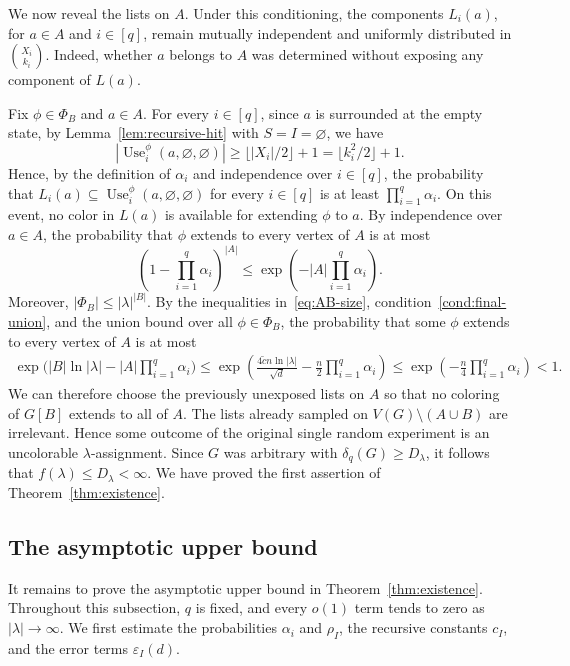 \documentclass[12pt]{article}
\numberwithin{equation}{section}
\theoremstyle{definition}
\newcommand{\Use}{\operatorname{Use}}
\begin{document}
We now reveal the lists on $A$. Under this conditioning,
the components $L_i(a)$, for $a\in A$ and $i\in[q]$, remain mutually
independent and uniformly distributed in $\binom{X_i}{k_i}$. Indeed, whether
$a$ belongs to $A$ was determined without exposing any component of $L(a)$.

Fix $\phi \in \Phi_B$ and $a \in A$. For every $i \in [q]$, since $a$ is
surrounded at the empty state, by Lemma~\ref{lem:recursive-hit} with
$S = I = \varnothing$, we have
\[
 |\Use_i^\phi(a, \varnothing, \varnothing)|
 \geq \lfloor |X_i|/2\rfloor + 1 = \lfloor k_i^2/2\rfloor + 1.
\]
Hence, by the definition of $\alpha_i$ and independence over $i \in [q]$,
the probability that
$L_i(a) \subseteq \Use_i^\phi(a, \varnothing, \varnothing)$ for every
$i \in [q]$ is at least $\prod_{i = 1}^q \alpha_i$.
On this event, no color in $L(a)$ is available for extending $\phi$ to $a$.
By independence over $a \in A$, the probability that $\phi$ extends to every
vertex of $A$ is at most
\[
 \left(1 - \prod_{i = 1}^q \alpha_i\right)^{|A|}
 \leq \exp\left(-|A|\prod_{i = 1}^q \alpha_i\right).
\]
Moreover, $|\Phi_B| \leq |\lambda|^{|B|}$. By the inequalities
in~\eqref{eq:AB-size}, condition~\ref{cond:final-union}, and the union bound over all
$\phi \in \Phi_B$, the probability that some $\phi$ extends to every vertex of
$A$ is at most
\begin{align*}
 \exp\bigl(|B|\ln |\lambda|
           -|A|\prod_{i = 1}^q \alpha_i\bigr) \leq
 \exp\left(
 \frac{4\widetilde{c}n\ln |\lambda|}{\sqrt{d}}
 -\frac{n}{2}\prod_{i = 1}^q \alpha_i\right)
  \leq \exp\left(-\frac{n}{4}\prod_{i = 1}^q \alpha_i\right) < 1.
\end{align*}
We can therefore choose the previously unexposed lists on $A$ so that no
coloring of $G[B]$ extends to all of $A$. The lists already sampled on
$V(G) \setminus (A \cup B)$ are irrelevant. Hence some outcome of the original
single random experiment is an uncolorable $\lambda$-assignment. Since $G$
was arbitrary with $\delta_q(G)\geq D_\lambda$, it follows that
$f(\lambda)\leq D_\lambda<\infty$. We have proved the first assertion of
Theorem~\ref{thm:existence}.

\subsection{The asymptotic upper bound}
\label{subsec:threshold}

It remains to prove the asymptotic upper bound in
Theorem~\ref{thm:existence}. Throughout this subsection, $q$ is fixed, and
every $o(1)$ term tends to zero as $|\lambda|\to\infty$. We first estimate
the probabilities $\alpha_i$ and $\rho_I$, the recursive
constants $c_I$, and the error terms $\varepsilon_I(d)$.
\end{document}
